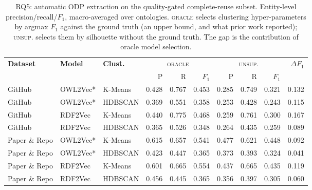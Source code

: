\begin{table}[t]
\centering
\small
\caption{RQ5: automatic ODP extraction on the quality-gated complete-reuse subset. Entity-level precision/recall/$F_1$, macro-averaged over ontologies. \textsc{oracle} selects clustering hyper-parameters by argmax $F_1$ against the ground truth (an upper bound, and what prior work reported); \textsc{unsup.} selects them by silhouette without the ground truth. The gap is the contribution of oracle model selection.}
\label{tab:rq5_extraction}
\setlength{\tabcolsep}{4pt}
\begin{tabular}{ll|l|rrr|rrr|r}
\toprule
\textbf{Dataset} & \textbf{Model} & \textbf{Clust.} & \multicolumn{3}{c|}{\textsc{oracle}} & \multicolumn{3}{c|}{\textsc{unsup.}} & $\Delta F_1$ \\
 & & & P & R & $F_1$ & P & R & $F_1$ & \\
\midrule
GitHub & OWL2Vec* & K-Means & 0.428 & 0.767 & 0.453 & 0.285 & 0.749 & 0.321 & 0.132 \\
GitHub & OWL2Vec* & HDBSCAN & 0.369 & 0.551 & 0.358 & 0.253 & 0.428 & 0.243 & 0.115 \\
GitHub & RDF2Vec & K-Means & 0.440 & 0.775 & 0.468 & 0.259 & 0.761 & 0.300 & 0.167 \\
GitHub & RDF2Vec & HDBSCAN & 0.365 & 0.526 & 0.348 & 0.264 & 0.435 & 0.259 & 0.089 \\
Paper \& Repo & OWL2Vec* & K-Means & 0.615 & 0.657 & 0.541 & 0.477 & 0.621 & 0.448 & 0.092 \\
Paper \& Repo & OWL2Vec* & HDBSCAN & 0.423 & 0.447 & 0.365 & 0.373 & 0.393 & 0.324 & 0.041 \\
Paper \& Repo & RDF2Vec & K-Means & 0.601 & 0.665 & 0.554 & 0.437 & 0.665 & 0.435 & 0.119 \\
Paper \& Repo & RDF2Vec & HDBSCAN & 0.456 & 0.445 & 0.365 & 0.356 & 0.397 & 0.305 & 0.060 \\
\bottomrule
\end{tabular}
\end{table}
